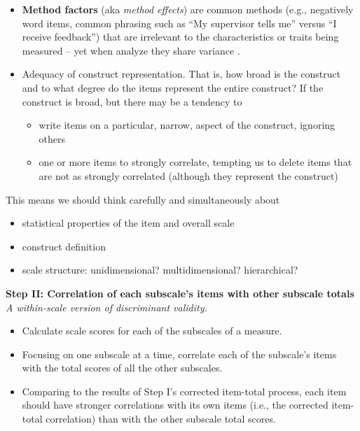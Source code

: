 \documentclass[
  english,
]{book}
\providecommand{\tightlist}{%
  \setlength{\itemsep}{0pt}\setlength{\parskip}{0pt}}
\begin{document}
\begin{itemize}
\tightlist
\item
  \textbf{Method factors} (aka \emph{method effects}) are common methods (e.g., negatively word items, common phrasing such as ``My supervisor tells me'' versus ``I receive feedback'') that are irrelevant to the characteristics or traits being measured -- yet when analyze they share variance \citep{chyung_evidencebased_2018}.
\item
  Adequacy of construct representation. That is, how broad is the construct and to what degree do the items represent the entire construct? If the construct is broad, but there may be a tendency to

  \begin{itemize}
  \tightlist
  \item
    write items on a particular, narrow, aspect of the construct, ignoring others
  \item
    one or more items to strongly correlate, tempting us to delete items that are not as strongly correlated (although they represent the construct)
  \end{itemize}
\end{itemize}

This means we should think carefully and simultaneously about

\begin{itemize}
\tightlist
\item
  statistical properties of the item and overall scale
\item
  construct definition
\item
  scale structure: unidimensional? multidimensional? hierarchical?
\end{itemize}

\textbf{Step II: Correlation of each subscale's items with other subscale totals}
\emph{A within-scale version of discriminant validity.}

\begin{itemize}
\tightlist
\item
  Calculate scale scores for each of the subscales of a measure.
\item
  Focusing on one subscale at a time, correlate each of the subscale's items with the total scores of all the other subscales.
\item
  Comparing to the results of Step I's corrected item-total process, each item should have stronger correlations with its own items (i.e., the corrected item-total correlation) than with the other subscale total scores.
\end{itemize}
\end{document}
